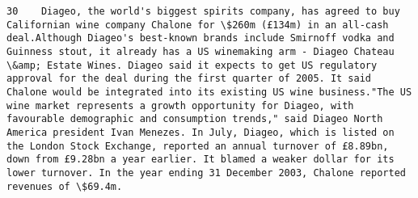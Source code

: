 \documentclass[11pt]{article}
\begin{document}
\begin{Verbatim}[commandchars=\\\{\}]
         30    Diageo, the world's biggest spirits company, has agreed to buy Californian wine company Chalone for \$260m (£134m) in an all-cash deal.Although Diageo's best-known brands include Smirnoff vodka and Guinness stout, it already has a US winemaking arm - Diageo Chateau \&amp; Estate Wines. Diageo said it expects to get US regulatory approval for the deal during the first quarter of 2005. It said Chalone would be integrated into its existing US wine business."The US wine market represents a growth opportunity for Diageo, with favourable demographic and consumption trends," said Diageo North America president Ivan Menezes. In July, Diageo, which is listed on the London Stock Exchange, reported an annual turnover of £8.89bn, down from £9.28bn a year earlier. It blamed a weaker dollar for its lower turnover. In the year ending 31 December 2003, Chalone reported revenues of \$69.4m.                                                                                                                                                                                                                                                                                                                                                                                                                                                                                                                                                                                                                                                                                                                                                                                                                                                                                                                                                                                                                                                                                                                                                                                                                                                                                                                                                                                                                                                                                                                                                                                                                                                                                                                                                                                                                                                                                                                                                                                                                                                                                                                                                                                                                                                                                                                                                                                                                                                                                             
\end{Verbatim}
\end{document}
